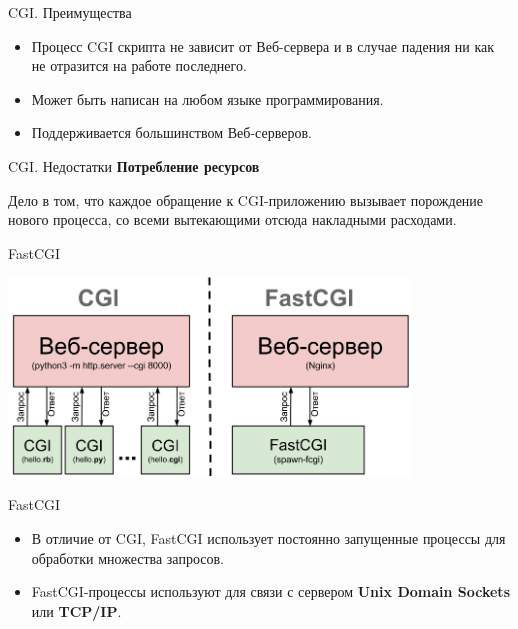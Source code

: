 \begin{frame}{CGI\@. Преимущества}
    \begin{itemize}
        \item Процесс CGI скрипта не зависит от Веб-сервера и в случае падения
            ни как не отразится на работе последнего.
        \item Может быть написан на любом языке программирования.
        \item Поддерживается большинством Веб-серверов.
    \end{itemize}
\end{frame}

\begin{frame}[fragile]{CGI\@. Недостатки}
    \textbf{Потребление ресурсов}\newline

    Дело в том, что каждое обращение к CGI-приложению вызывает порождение
    нового процесса, со всеми вытекающими отсюда накладными расходами.
\end{frame}

\begin{frame}{FastCGI}
    \begin{center}
        \includegraphics[width=4.2in]{media/fastcgi.png}
    \end{center}
\end{frame}

\begin{frame}{FastCGI}
    \begin{itemize}
        \item В отличие от CGI, FastCGI использует постоянно запущенные
            процессы для обработки множества запросов.
        \item FastCGI-процессы используют для связи с сервером \textbf{Unix Domain
            Sockets} или \textbf{TCP/IP}.
    \end{itemize}
\end{frame}

